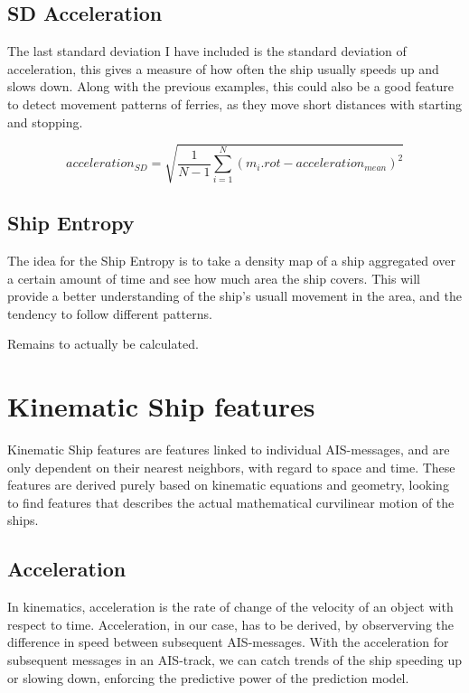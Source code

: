 \subsection{SD Acceleration}
The last standard deviation I have included is the standard deviation of acceleration, this gives a measure of how often the ship usually speeds up and slows down. Along with the previous examples, this could also be a good feature to detect movement patterns of ferries, as they move short distances with starting and stopping.

$$
	acceleration_{SD} = \sqrt{\dfrac{1}{N-1}\sum_{i=1}^N(m_i.rot - acceleration_{mean})^2 }
$$

\subsection{Ship Entropy}

The idea for the Ship Entropy is to take a density map of a ship aggregated over a certain amount of time and see how much area the ship covers. This will provide a better understanding of the ship's usuall movement in the area, and the tendency to follow different patterns.

Remains to actually be calculated.

\section{Kinematic Ship features}

Kinematic Ship features are features linked to individual AIS-messages, and are only dependent on their nearest neighbors, with regard to space and time. These features are derived purely based on kinematic equations and geometry, looking to find features that describes the actual mathematical curvilinear motion of the ships.


\begin{info}{}
\end{info}

\subsection{Acceleration}

In kinematics, acceleration is the rate of change of the velocity of an object with respect to time.  Acceleration, in our case, has to be derived, by observerving the difference in speed between subsequent AIS-messages. With the acceleration for subsequent messages in an AIS-track, we can catch trends of the ship speeding up or slowing down, enforcing the predictive power of the prediction model.

